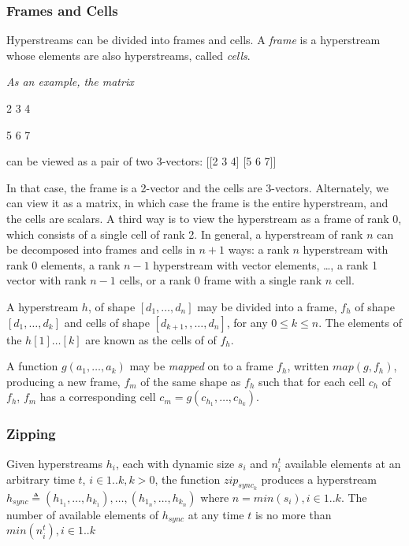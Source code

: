 \documentclass{article}
\begin{document}
\subsubsection{Frames and Cells}
\label{framesAndCells}

Hyperstreams can be divided into frames and cells. A {\em frame} is a hyperstream whose elements are also hyperstreams, called {\em cells}.

{\em As an example, the matrix 

2 3 4

5 6 7

 can be viewed as a pair of two 3-vectors:
[[2 3 4] [5 6 7]]

In that case, the frame is a 2-vector and the cells are 3-vectors.  Alternately, we can view it as a matrix, in which case the frame is the entire hyperstream, and the cells are scalars. A third way is to view the hyperstream as a frame of rank 0, which consists of a single cell of rank 2. In general, a hyperstream of rank $n$ can be decomposed into frames and cells in $n+1$ ways: a rank $n$ hyperstream with rank 0 elements, a rank $n-1$ hyperstream with vector elements, …, a rank 1 vector with rank $n-1$ cells, or a rank 0 frame with a single rank $n$ cell.
}

A hyperstream $h$, of shape $[d_1, \ldots, d_n]$ may be divided into a frame, $f_h$ of shape $[d_1, \ldots, d_k]$ and cells of shape $[d_{k+1}, , \ldots, d_n]$, for any $0 \le k \le n$.
The elements of the $h[1] \ldots [k]$ are known as the cells of of $f_h$.

A function $g(a_1, \ldots, a_k)$ may be {\em mapped} on to a frame $f_h$, written $map(g, f_h)$, producing a new frame, $f_m$ of the same shape as $f_h$ such that for each cell $c_h$ of $f_h$, $f_m$ has a corresponding cell $c_m = g(c_{h_1}, \ldots, c_{h_k})$.

\subsubsection{Zipping}
\label{zipping}

Given hyperstreams $h_i$, each with dynamic size $s_i$ and $n_i^t$  available elements at an arbitrary time $t$, $ i \in 1..k, k > 0$, the function $zip_{sync_k}$ produces a hyperstream 
 \newline
 $h_{sync} \triangleq (h_{1_1}, \ldots, h_{k_1}), \ldots, (h_{1_n}, \ldots, h_{k_n})$ 
 \newline
 where $n = min(s_i), i \in 1..k$.
 The number of available elements of $h_{sync}$ at any time $t$ is no more than $min(n_i^t), i \in 1..k$
\end{document}
